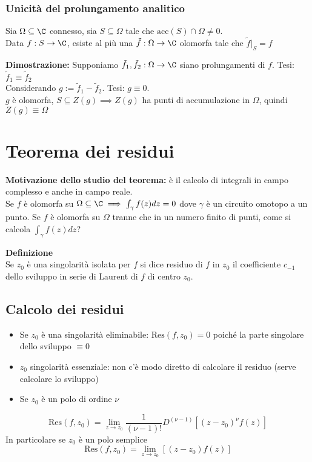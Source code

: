 \subsubsection{Unicità del prolungamento analitico}
\begin{tcolorbox}
	Sia $\Omega \subseteq  \C$ connesso, sia $S \subseteq  \Omega$ tale che $\text{acc}(S)\cap \Omega \neq 0$.
	\\Data $f:S\to \C$, esiste al più una $\tilde f:\Omega\to \C$ olomorfa tale che $\tilde f|_S=f$
\end{tcolorbox}
\textbf{Dimostrazione: }Supponiamo $\tilde f_1,\tilde f_2:\Omega\to \C$ siano prolungamenti di $f$. Tesi: $\tilde f_1\equiv \tilde f_2$
\\Considerando $g:=\tilde f_1-\tilde f_2$. Tesi: $g\equiv 0$.
\\$g$ è olomorfa, $S \subseteq  Z(g)\implies Z(g)$ ha punti di accumulazione in $\Omega$, quindi $Z(g)\equiv \Omega$ 

\section{Teorema dei residui}
\textbf{Motivazione dello studio del teorema: }è il calcolo di integrali in campo complesso e anche in campo reale.
\\Se $f$ è olomorfa su $\Omega \subseteq  \C \implies \int_{\gamma}^{} f(z)dz=0$ dove $\gamma$ è un circuito omotopo a un punto.
Se $f$ è olomorfa su $\Omega$ tranne che in un numero finito di punti, come si calcola $\int_{\gamma}^{} f(z)dz$?
\begin{tcolorbox}
	\textbf{Definizione}\\ 
	Se $z_0$ è una singolarità isolata per $f$ si dice residuo di $f$ in $z_0$ il coefficiente $c_{-1}$ dello sviluppo in serie di Laurent di $f$ di centro $z_0$.
\end{tcolorbox}
\subsection{Calcolo dei residui}
\begin{itemize}
	\item Se $z_0$ è una singolarità eliminabile: $\text{Res}(f,z_0)=0$ poiché la parte singolare dello sviluppo $\equiv 0$
	\item $z_0$ singolarità essenziale: non c'è modo diretto di calcolare il residuo (serve calcolare lo sviluppo)
	\item Se $z_0$ è un polo di ordine $\nu$
\end{itemize}
\[\text{Res}(f,z_0)=\lim_{z \to z_0} \frac{1}{(\nu-1)!}D^{(\nu-1)}[(z-z_0)^\nu f(z)]\]
In particolare se $z_0$ è un polo semplice
\[\text{Res}(f,z_0)=\lim_{z \to z_0} [(z-z_0)f(z)]\]
